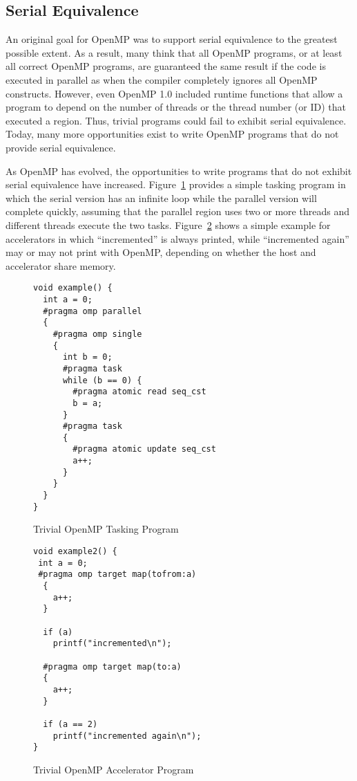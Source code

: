 \subsection{Serial Equivalence}
\label{sub:serial_equivalence}

An original goal for OpenMP was to support serial equivalence to the 
greatest possible extent. As a result, many think that all OpenMP programs, 
or at least all correct OpenMP programs, are guaranteed the same result
if the code is executed in parallel as when the compiler completely 
ignores all OpenMP constructs. However, even OpenMP 1.0 included runtime
functions that allow a program to depend on the number of threads or the
thread number (or ID) that executed a region. Thus, trivial programs could
fail to exhibit serial equivalence. Today, many more opportunities exist
to write OpenMP programs that do not provide serial equivalence. 

As OpenMP has evolved, the opportunities to write programs that do not
exhibit serial equivalence have increased. Figure~\ref{fig:trivial_task} 
provides a simple tasking program in which the serial version has an infinite 
loop while the parallel version will complete quickly, assuming that the 
parallel region uses two or more threads and different threads execute the 
two tasks. Figure~\ref{fig:trivial_target} shows a simple example for 
accelerators in which ``incremented'' is always printed, while 
``incremented again'' may or may not print with OpenMP, depending on 
whether the host and accelerator share memory. 

\begin{figure}
\begin{verbatim}
void example() {
  int a = 0;
  #pragma omp parallel
  {
    #pragma omp single
    {
      int b = 0;
      #pragma task
      while (b == 0) {
        #pragma atomic read seq_cst
        b = a;
      }
      #pragma task
      {
        #pragma atomic update seq_cst
        a++;
      }
    }
  }
}
\end{verbatim}
\caption{Trivial OpenMP Tasking Program\label{fig:trivial_task}}
\end{figure}

\begin{figure}
\begin{verbatim}
void example2() {
 int a = 0;
 #pragma omp target map(tofrom:a)
  {
    a++;
  }

  if (a)
    printf("incremented\n");
  
  #pragma omp target map(to:a)
  {
    a++;
  }

  if (a == 2)
    printf("incremented again\n");
}
\end{verbatim}
\caption{Trivial OpenMP Accelerator Program\label{fig:trivial_target}}
\end{figure}


